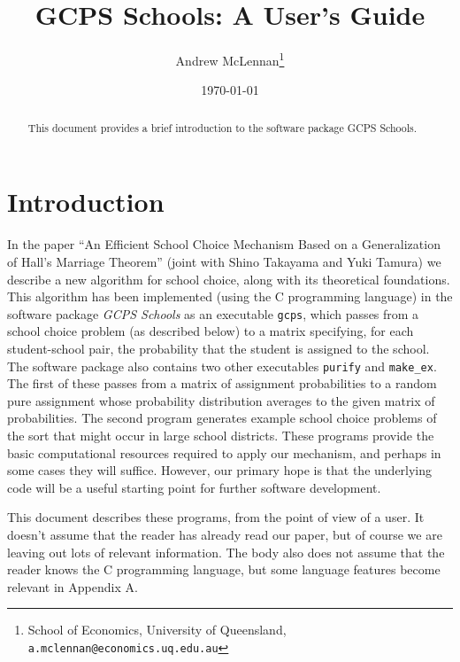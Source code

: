 \documentclass[12pt]{article}
\theoremstyle{definition}
\begin{document}
\title{GCPS Schools: A User's Guide}

\author{Andrew McLennan\footnote{School of Economics, University of
    Queensland, {\tt a.mclennan@economics.uq.edu.au}}}

\date{\today}

\maketitle

\begin{abstract}
This document provides a brief introduction to the software package GCPS Schools.
\end{abstract}


\section{Introduction}

In the paper ``An Efficient School Choice Mechanism Based on a
Generalization of Hall's Marriage Theorem'' (joint with Shino Takayama
and Yuki Tamura) we describe a new algorithm for school choice, along
with its theoretical foundations.  This algorithm has been implemented
(using the C programming language) in the software package \emph{GCPS
  Schools} as an executable \texttt{gcps}, which passes from a school
choice problem (as described below) to a matrix specifying, for each
student-school pair, the probability that the student is assigned to
the school.  The software package also contains two other executables
\texttt{purify} and \texttt{make\_ex}.  The first of these passes from
a matrix of assignment probabilities to a random pure assignment whose
probability distribution averages to the given matrix of
probabilities.  The second program generates example school choice
problems of the sort that might occur in large school districts.
These programs provide the basic computational resources required to
apply our mechanism, and perhaps in some cases they will suffice.
However, our primary hope is that the underlying code will be a useful
starting point for further software development.

This document describes these programs, from the point of view of a
user.  It doesn't assume that the reader has already read our paper,
but of course we are leaving out lots of relevant information.  The
body also does not assume that the reader knows the C programming
language, but some language features become relevant in Appendix A.
\end{document}
